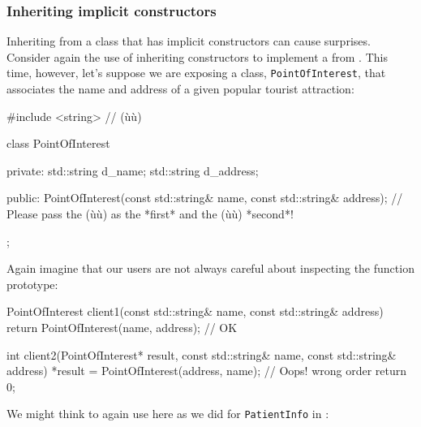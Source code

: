 \subsubsection[Inheriting \emph{implicit} constructors]{Inheriting {\sfbsubsubsecitalRomeo implicit} constructors}\label{beware-of-inheriting-implicit-constructors}

Inheriting from a class that has implicit constructors can cause
surprises. Consider again the use of inheriting constructors to
implement a  from . 
This time, however, let's suppose we are
exposing a class,
\lstinline!PointOfInterest!, that associates the name and address of a
given popular tourist attraction:

\begin{emcppslisting}[emcppsbatch=e10]
#include <string>  // (ù{}ù)

class PointOfInterest
{
private:
    std::string d_name;
    std::string d_address;

public:
    PointOfInterest(const std::string& name, const std::string& address);
        // Please pass the (ù{}ù) as the *first* and the (ù{}ù) *second*!
};
\end{emcppslisting}
    
\noindent Again imagine that our users are not always careful about inspecting the
function prototype:

\begin{emcppslisting}[emcppsbatch=e10]
PointOfInterest client1(const std::string& name, const std::string& address)
{
    return PointOfInterest(name, address);  // OK
}

int client2(PointOfInterest*   result,                                          
            const std::string& name,                                            
            const std::string& address)
{
    *result = PointOfInterest(address, name);  // Oops! wrong order
    return 0;
}
\end{emcppslisting}
    
\noindent We might think to again use  here as we
did for \lstinline!PatientInfo! in : 

